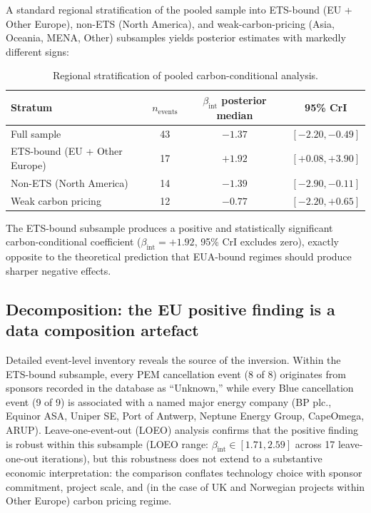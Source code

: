 \documentclass[11pt,a4paper]{article}
\newcommand{\bint}{\beta_{\mathrm{int}}}
\begin{document}
A standard regional stratification of the pooled sample into ETS-bound (EU + Other Europe), non-ETS (North America), and weak-carbon-pricing (Asia, Oceania, MENA, Other) subsamples yields posterior estimates with markedly different signs:

\begin{table}[h!]
\centering
\caption{Regional stratification of pooled carbon-conditional analysis.}
\begin{tabular}{lccc}
\toprule
Stratum & $n_{\mathrm{events}}$ & $\bint$ posterior median & 95\% CrI \\
\midrule
Full sample & 43 & $-1.37$ & $[-2.20, -0.49]$ \\
ETS-bound (EU + Other Europe) & 17 & $\mathbf{+1.92}$ & $\mathbf{[+0.08, +3.90]}$ \\
Non-ETS (North America) & 14 & $-1.39$ & $[-2.90, -0.11]$ \\
Weak carbon pricing & 12 & $-0.77$ & $[-2.20, +0.65]$ \\
\bottomrule
\end{tabular}
\label{tab:ch7-regional}
\end{table}

The ETS-bound subsample produces a positive and statistically significant carbon-conditional coefficient ($\bint = +1.92$, 95\% CrI excludes zero), exactly opposite to the theoretical prediction that EUA-bound regimes should produce sharper negative effects.

\subsection{Decomposition: the EU positive finding is a data composition artefact}

Detailed event-level inventory reveals the source of the inversion. Within the ETS-bound subsample, every PEM cancellation event (8 of 8) originates from sponsors recorded in the database as ``Unknown,'' while every Blue cancellation event (9 of 9) is associated with a named major energy company (BP plc., Equinor ASA, Uniper SE, Port of Antwerp, Neptune Energy Group, CapeOmega, ARUP). Leave-one-event-out (LOEO) analysis confirms that the positive finding is robust within this subsample (LOEO range: $\bint \in [1.71, 2.59]$ across 17 leave-one-out iterations), but this robustness does not extend to a substantive economic interpretation: the comparison conflates technology choice with sponsor commitment, project scale, and (in the case of UK and Norwegian projects within Other Europe) carbon pricing regime.
\end{document}
